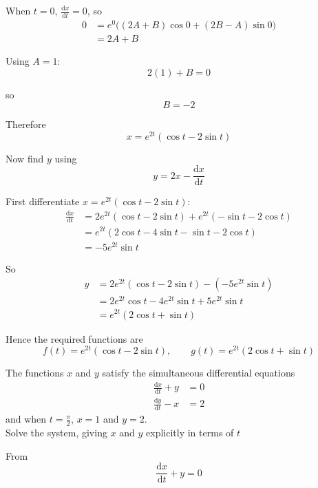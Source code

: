 \documentclass[leqno]{article}
\begin{document}
\begin{enumerate}[
  label=\textbf{\arabic*.},
  leftmargin=*,
  topsep=0pt,
  partopsep=0pt,
  parsep=0pt
]
\begin{djsSolution}
When \(t=0\), \(\frac{\mathrm{d}x}{\mathrm{d}t}=0\), so
\begin{align*}
0&=e^0\bigl((2A+B)\cos 0+(2B-A)\sin 0\bigr)\\
&=2A+B
\end{align*}

Using \(A=1\):
\[
2(1)+B=0
\]

so
\[
B=-2
\]

Therefore
\[
x=e^{2t}(\cos t-2\sin t)
\]

Now find \(y\) using
\[
y=2x-\frac{\mathrm{d}x}{\mathrm{d}t}
\]

First differentiate \(x=e^{2t}(\cos t-2\sin t)\):
\begin{align*}
\frac{\mathrm{d}x}{\mathrm{d}t}
&=2e^{2t}(\cos t-2\sin t)+e^{2t}(-\sin t-2\cos t)\\
&=e^{2t}(2\cos t-4\sin t-\sin t-2\cos t)\\
&=-5e^{2t}\sin t
\end{align*}

So
\begin{align*}
y
&=2e^{2t}(\cos t-2\sin t)-\left(-5e^{2t}\sin t\right)\\
&=2e^{2t}\cos t-4e^{2t}\sin t+5e^{2t}\sin t\\
&=e^{2t}(2\cos t+\sin t)
\end{align*}

Hence the required functions are
\[
f(t)=e^{2t}(\cos t-2\sin t),\qquad g(t)=e^{2t}(2\cos t+\sin t)
\]
\end{djsSolution}


\newpage

\questionitem

The functions $x$ and $y$ satisfy the simultaneous differential equations \\
\begin{align*}
\frac{\mathrm{d}x}{\mathrm{d}t}+y&=0\\[5pt]
\frac{\mathrm{d}y}{\mathrm{d}t}-x&=2
\end{align*}
and when $t=\frac{\pi}{2}$, $x=1$ and $y=2$. \\

Solve the system, giving $x$ and $y$ explicitly in terms of $t$  \\

\vspace*{10pt}

\begin{djsSolution}
  From
  \[
  \frac{\mathrm{d}x}{\mathrm{d}t}+y=0
  \]


\end{djsSolution}
\end{enumerate}
\end{document}
